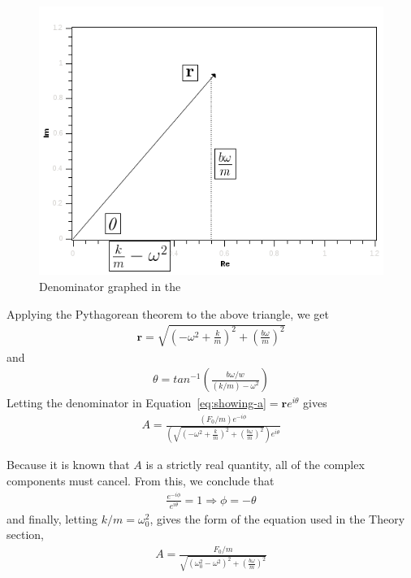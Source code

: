 \documentclass[twocolumn,english]{IEEEtran}
\theoremstyle{plain}
\theoremstyle{plain}
\begin{document}
  \begin{figure}[h!]
  \begin{centering}
  \begin{center}
  \includegraphics[width=\linewidth]{./Images/real_im.png}
  \caption{Denominator graphed in the }
  \label{fig:real_im}
  \end{center}
  \par\end{centering}
  \end{figure}

  Applying the Pythagorean theorem to the above triangle, we get
  \begin{align*}
   \mathbf{r} = \sqrt{(-\omega^2 + \frac{k}{m})^2 + (\frac{b\omega}{m})^2}
  \end{align*}
  and
  \begin{align*}
   \theta = tan^{-1}\left( \frac{b\omega/w}{(k/m) - \omega^2}\right)
  \end{align*}
  Letting the denominator in Equation~\ref{eq:showing-a}$= \mathbf{r}e^{i\theta}$ gives
  \begin{align*}
   A = \frac{(F_0/m)e^{-i\phi}}{\left(\sqrt{(-\omega^2 + \frac{k}{m})^2 + (\frac{b\omega}{m})^2}\right)e^{i\theta}}
  \end{align*}

  Because it is known that $A$ is a strictly real quantity, all of the complex components must cancel. From this, we conclude that
  \begin{align*}
   \frac{e^{-i\phi}}{e^{i\theta}} = 1 \Rightarrow \phi = -\theta
  \end{align*}
  and finally, letting $k/m = \omega_0^2$, gives the form of the equation used in the Theory section,
  \begin{align*}
   A = \frac{F_0/m}{\sqrt{(\omega_0^2 - \omega^2)^2 + (\frac{b\omega}{m})^2}}
  \end{align*}

%
%
\end{document}
